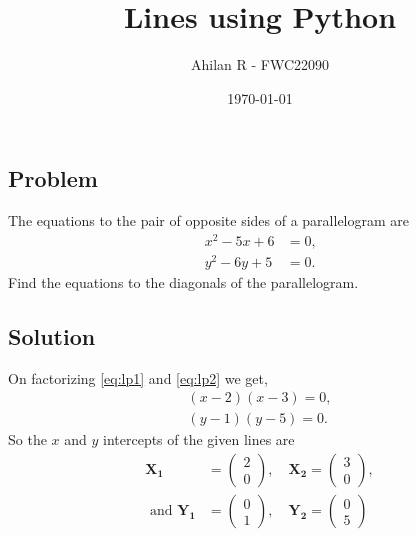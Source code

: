 \documentclass[journal,12pt,twocolumn]{IEEEtran}
\title{Lines using Python}
\author{Ahilan R - FWC22090}
\date{\today}
\let\vec\mathbf
\newcommand{\myvec}[1]{\ensuremath{\begin{pmatrix}#1\end{pmatrix}}}
\begin{document}
\maketitle

\subsection*{\textbf{Problem}}
The equations to the pair of opposite sides of a parallelogram are 
\begin{align}
		x^2-5x+6 &= 0	\text{,}	\label{eq:lp1} \\
		y^2-6y+5 &= 0	\text{.}\label{eq:lp2}
\end{align} 
Find the equations to the diagonals of the parallelogram.

\subsection*{\textbf{Solution}}


%

On factorizing \eqref{eq:lp1} and \eqref{eq:lp2} we get, 
\begin{align*}
	(x-2)(x-3)=0, \\
	(y-1)(y-5)=0.
\end{align*}
So the $x$ and $y$ intercepts of the given lines are 
\medskip
\begin{align*}
	\vec{X_1} &= \myvec{2\\0}, \quad 	\vec{X_2} = \myvec{3\\0}, \\
	\text{ and } \vec{Y_1} &= \myvec{0\\1}, \quad	\vec{Y_2} = \myvec{0\\5}
\end{align*}
\end{document}

